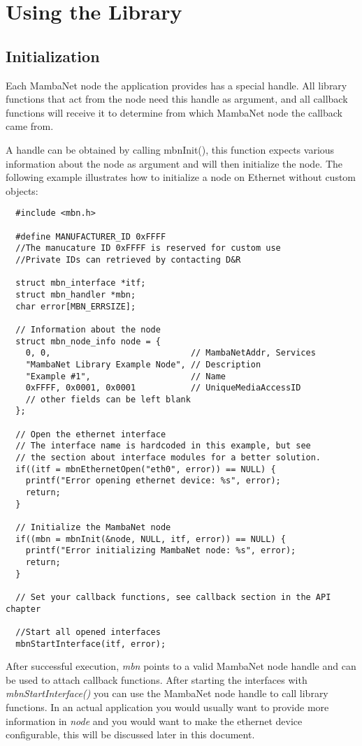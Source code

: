 \chapter{Using the Library}
\section{Initialization}
Each MambaNet node the application provides has a special handle. All library functions that act from the node need this handle as argument, and all callback functions will receive it to determine from which MambaNet node the callback came from.

A handle can be obtained by calling mbnInit(), this function expects various information about the node as argument and will then initialize the node. The following example illustrates how to initialize a node on Ethernet without custom objects:
\begin{verbatim}
  #include <mbn.h>

  #define MANUFACTURER_ID 0xFFFF
  //The manucature ID 0xFFFF is reserved for custom use
  //Private IDs can retrieved by contacting D&R

  struct mbn_interface *itf;
  struct mbn_handler *mbn;
  char error[MBN_ERRSIZE];

  // Information about the node
  struct mbn_node_info node = {
    0, 0,                            // MambaNetAddr, Services
    "MambaNet Library Example Node", // Description
    "Example #1",                    // Name
    0xFFFF, 0x0001, 0x0001           // UniqueMediaAccessID
    // other fields can be left blank
  };

  // Open the ethernet interface
  // The interface name is hardcoded in this example, but see
  // the section about interface modules for a better solution.
  if((itf = mbnEthernetOpen("eth0", error)) == NULL) {
    printf("Error opening ethernet device: %s", error);
    return;
  }

  // Initialize the MambaNet node
  if((mbn = mbnInit(&node, NULL, itf, error)) == NULL) {
    printf("Error initializing MambaNet node: %s", error);
    return;
  }

  // Set your callback functions, see callback section in the API chapter

  //Start all opened interfaces
  mbnStartInterface(itf, error);
\end{verbatim}

After successful execution, \textit{mbn} points to a valid MambaNet node handle and can be used to attach callback functions. After starting the interfaces with \textit{mbnStartInterface()} you can use the MambaNet node handle to call library functions. In an actual application you would usually want to provide more information in \textit{node} and you would want to make the ethernet device configurable, this will be discussed later in this document.

